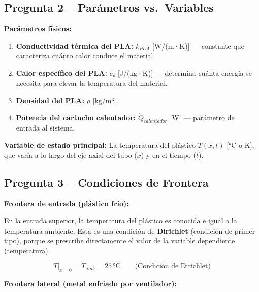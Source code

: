 \documentclass[12pt,a4paper]{article}
\begin{document}
\subsection*{Pregunta 2 -- Parámetros vs.\ Variables}

\noindent\textbf{Parámetros físicos:}
\begin{enumerate}
    \item \textbf{Conductividad térmica del PLA:} $k_{PLA}$ [W/(m·K)] --- constante que
          caracteriza cuánto calor conduce el material.
    \item \textbf{Calor específico del PLA:} $c_p$ [J/(kg·K)] --- determina cuánta energía se
          necesita para elevar la temperatura del material.
    \item \textbf{Densidad del PLA:} $\rho$ [kg/m³].
    \item \textbf{Potencia del cartucho calentador:} $\dot{Q}_{calentador}$ [W] --- parámetro de
          entrada al sistema.
\end{enumerate}

\noindent\textbf{Variable de estado principal:} La temperatura del plástico $T(x, t)$ [°C o K],
que varía a lo largo del eje axial del tubo ($x$) y en el tiempo ($t$).

\subsection*{Pregunta 3 -- Condiciones de Frontera}

\noindent\textbf{Frontera de entrada (plástico frío):}

En la entrada superior, la temperatura del plástico es conocida e igual a la temperatura ambiente.
Esta es una condición de \textbf{Dirichlet} (condición de primer tipo), porque se prescribe
directamente el valor de la variable dependiente (temperatura).

\begin{equation}
    T\big|_{x=0} = T_{amb} = 25\,\text{°C} \qquad \text{(Condición de Dirichlet)}
\end{equation}

\noindent\textbf{Frontera lateral (metal enfriado por ventilador):}
\end{document}
